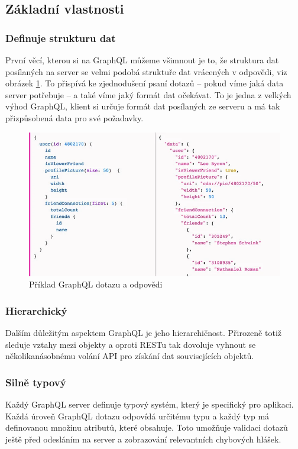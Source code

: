 \documentclass[thesis=M,czech]{FITthesis}[2019/12/23]
\begin{document}
\subsection{Základní vlastnosti}
\subsubsection*{Definuje strukturu dat}
První věcí, kterou si na GraphQL můžeme všimnout je to, že struktura dat posílaných na server se velmi podobá struktuře dat vrácených v odpovědi, viz obrázek \ref{graphql-query}. To přispívá ke zjednodušení psaní dotazů -- pokud víme jaká data server potřebuje -- a také víme jaký formát dat očekávat. To je jedna z velkých výhod GraphQL, klient si určuje formát dat posílaných ze serveru a má tak přizpůsobená data pro své požadavky.

\begin{figure}[h]
    \includegraphics[width=\linewidth]{img/graphql-query.png}
    \caption{Příklad GraphQL dotazu a odpovědi \cite{graphql_query_img}}
	\label{graphql-query}
\end{figure}

\subsubsection*{Hierarchický}
Dalším důležitým aspektem GraphQL je jeho hierarchičnost. Přirozeně totiž sleduje vztahy mezi objekty a oproti RESTu tak dovoluje vyhnout se několikanásobnému volání API pro získání dat souvisejících objektů.

\subsubsection*{Silně typový}
Každý GraphQL server definuje typový systém, který je specifický pro aplikaci.
Každá úroveň GraphQL dotazu odpovídá určitému typu a každý typ má definovanou množinu atributů, které obsahuje. Toto umožňuje validaci dotazů ještě před odesláním na server a zobrazování relevantních chybových hlášek.
\end{document}
